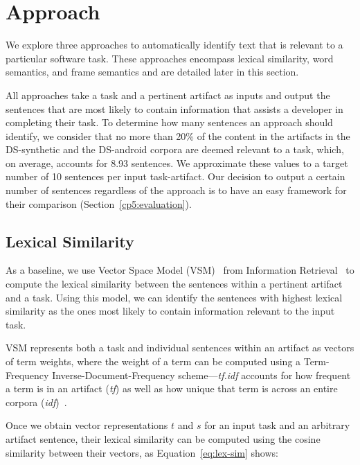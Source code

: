 \section{Approach}
\label{cp5:approaches}


We explore three approaches to automatically identify text that is relevant to a particular software task.
These approaches encompass lexical similarity, word semantics, and frame semantics and are detailed later in this section.



All approaches take a task and a pertinent artifact as inputs and output the sentences 
that are most likely to contain information that assists a developer in completing their task. 
To determine how many sentences an approach should identify, we consider that 
no more than 20\% of the content in the artifacts in the
 \acs{DS-synthetic} and the \acs{DS-android} corpora are deemed relevant to a task, which, on average, accounts for 8.93 sentences. 
We approximate these values to a target number of 10 sentences per input task-artifact. 
Our decision to output a certain number of sentences regardless of the approach is to have an easy framework for their comparison (Section~\ref{cp5:evaluation}).



\subsection{Lexical Similarity}

As a baseline, we use Vector Space Model (VSM)~\cite{Salton1975vsm} from Information Retrieval~\cite{Manning2009IR}
to compute the lexical similarity between the sentences within a pertinent artifact and a task. 
Using this model, we can identify the sentences with highest lexical similarity 
as the ones most likely to contain information relevant to the input task.




VSM represents both a task and individual sentences within an artifact as vectors of term weights,
where the weight of a term
can be computed using a Term-Frequency Inverse-Document-Frequency scheme---\textit{tf.idf} accounts for how frequent a term is in an artifact (\textit{tf}) as well as how 
unique that term is across an entire corpora (\textit{idf})~\cite{Manning2009IR}. 


Once we obtain vector representations $t$ and $s$ 
for an input task and an arbitrary artifact sentence, 
their lexical similarity can be computed 
using the cosine similarity between their vectors, as Equation~\ref{eq:lex-sim} shows:



